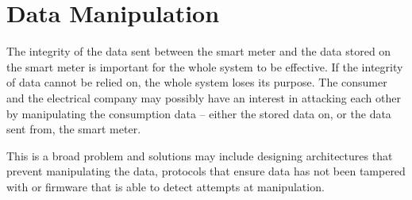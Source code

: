 \section{Data Manipulation}
The integrity of the data sent between the smart meter and the data stored on the smart meter is important for the whole system to be effective.
If the integrity of data cannot be relied on, the whole system loses its purpose.
The consumer and the electrical company may possibly have an interest in attacking each other by manipulating the consumption data -- either the stored data on, or the data sent from, the smart meter.

This is a broad problem and solutions may include designing architectures that prevent manipulating the data, protocols that ensure data has not been tampered with or firmware that is able to detect attempts at manipulation.